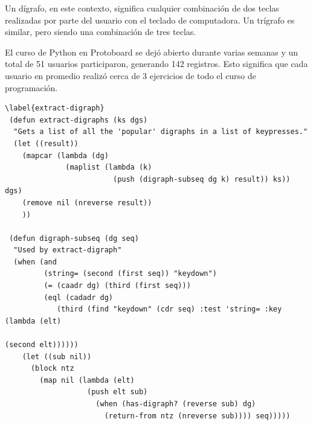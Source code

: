 Un dígrafo, en este contexto, significa cualquier combinación de dos
teclas realizadas por parte del usuario con el teclado de
computadora. Un trígrafo es similar, pero siendo una combinación de
tres teclas.

El curso de Python en Protoboard se dejó abierto durante varias
semanas y un total de 51 usuarios participaron, generando 142
registros. Esto significa que cada usuario en promedio realizó
cerca de 3 ejercicios de todo el curso de programación.


\begin{lstlisting}[frame=single]
\label{extract-digraph}
 (defun extract-digraphs (ks dgs)
  "Gets a list of all the 'popular' digraphs in a list of keypresses."
  (let ((result))
    (mapcar (lambda (dg)
              (maplist (lambda (k)
                         (push (digraph-subseq dg k) result)) ks)) dgs)
    (remove nil (nreverse result))
    ))

 (defun digraph-subseq (dg seq)
  "Used by extract-digraph"
  (when (and
         (string= (second (first seq)) "keydown")
         (= (caadr dg) (third (first seq)))
         (eql (cadadr dg)
            (third (find "keydown" (cdr seq) :test 'string= :key (lambda (elt)
                                                                   (second elt))))))
    (let ((sub nil))
      (block ntz
        (map nil (lambda (elt)
                   (push elt sub)
                     (when (has-digraph? (reverse sub) dg)
                       (return-from ntz (nreverse sub)))) seq)))))


\end{lstlisting}
